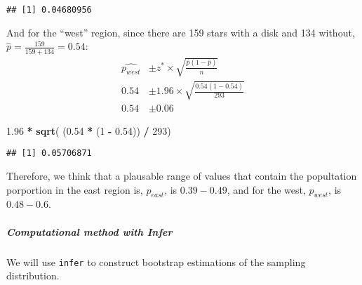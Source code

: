 \documentclass[]{article}
\newenvironment{Shaded}{\begin{snugshade}}{\end{snugshade}}
\newcommand{\CommentTok}[1]{\textcolor[rgb]{0.56,0.35,0.01}{\textit{#1}}}
\newcommand{\DataTypeTok}[1]{\textcolor[rgb]{0.13,0.29,0.53}{#1}}
\newcommand{\DecValTok}[1]{\textcolor[rgb]{0.00,0.00,0.81}{#1}}
\newcommand{\FloatTok}[1]{\textcolor[rgb]{0.00,0.00,0.81}{#1}}
\newcommand{\KeywordTok}[1]{\textcolor[rgb]{0.13,0.29,0.53}{\textbf{#1}}}
\newcommand{\NormalTok}[1]{#1}
\newcommand{\OperatorTok}[1]{\textcolor[rgb]{0.81,0.36,0.00}{\textbf{#1}}}
\newcommand{\StringTok}[1]{\textcolor[rgb]{0.31,0.60,0.02}{#1}}
\let\oldsubparagraph\subparagraph
\renewcommand{\subparagraph}[1]{\oldsubparagraph{#1}\mbox{}}
\begin{document}
\begin{verbatim}
## [1] 0.04680956
\end{verbatim}

And for the ``west'' region, since there are 159 stars with a disk and
134 without, \(\hat{p} = \frac{159}{159 + 134} = 0.54\): \[
\begin{aligned}
\hat{p_{west}} & \pm z^{*} \times \sqrt{\frac{\hat{p}(1-\hat{p})}{n}} \\
0.54 & \pm 1.96 \times \sqrt{\frac{0.54(1-0.54)}{293}} \\
0.54 & \pm 0.06
\end{aligned}
\]

\begin{Shaded}
\begin{Highlighting}[]
\FloatTok{1.96} \OperatorTok{*}\StringTok{ }\KeywordTok{sqrt}\NormalTok{( (}\FloatTok{0.54} \OperatorTok{*}\StringTok{ }\NormalTok{(}\DecValTok{1} \OperatorTok{-}\StringTok{ }\FloatTok{0.54}\NormalTok{)) }\OperatorTok{/}\StringTok{ }\DecValTok{293}\NormalTok{)}
\end{Highlighting}
\end{Shaded}

\begin{verbatim}
## [1] 0.05706871
\end{verbatim}

Therefore, we think that a plausable range of values that contain the
popultation porportion in the east region is, \(p_{east}\), is
\(0.39 - 0.49\), and for the west, \(p_{west}\), is \(0.48 - 0.6\).

\hypertarget{computational-method-with-infer}{%
\subparagraph{Computational method with
Infer}\label{computational-method-with-infer}}

We will use \texttt{infer} to construct bootstrap estimations of the
sampling distribution.

\begin{Shaded}
\end{Shaded}
\end{document}
